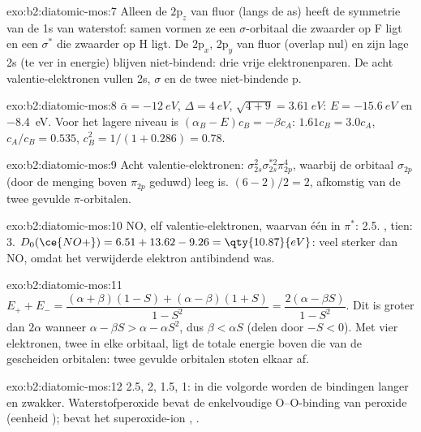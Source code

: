 \begin{solution}{exo:b2:diatomic-mos:7}
Alleen de $2\mathrm p_z$ van fluor (langs de as) heeft de symmetrie van de 1s van waterstof:
samen vormen ze een $\sigma$-orbitaal die zwaarder op F ligt en een $\sigma^*$ die zwaarder op H ligt. De
$2\mathrm p_x$, $2\mathrm p_y$ van fluor (overlap nul) en zijn lage 2s (te ver in energie)
blijven niet-bindend: drie vrije elektronenparen. De acht valentie-elektronen vullen 2s, $\sigma$
en de twee niet-bindende p.
\end{solution}

\begin{solution}{exo:b2:diatomic-mos:8}
$\bar\alpha = \qty{-12}{eV}$, $\Delta = \qty{4}{eV}$, $\sqrt{4 + 9} = \qty{3.61}{eV}$:
$E = \qty{-15.6}{eV}$ en \qty{-8.4}{eV}. Voor het lagere niveau is $(\alpha_B - E)c_B = -\beta
c_A$: $1.61c_B = 3.0c_A$, $c_A/c_B = 0.535$, $c_B^2 = 1/(1 + 0.286) = 0.78$.
\end{solution}

\begin{solution}{exo:b2:diatomic-mos:9}
Acht valentie-elektronen: $\sigma_{2s}^2\sigma_{2s}^{*2}\pi_{2p}^4$, waarbij de orbitaal $\sigma_{2p}$
(door de menging boven $\pi_{2p}$ geduwd) leeg is.  $(6 - 2)/2 = 2$, afkomstig van de
twee gevulde $\pi$-orbitalen.
\end{solution}

\begin{solution}{exo:b2:diatomic-mos:10}
NO, elf valentie-elektronen, waarvan één in $\pi^*$:  2.5. , tien: 
3. $D_0(\ce{NO+}) = 6.51 + 13.62 - 9.26 = \qty{10.87}{eV}$: veel sterker dan NO, omdat
het verwijderde elektron antibindend was.
\end{solution}

\begin{solution}{exo:b2:diatomic-mos:11}
$E_+ + E_- = \dfrac{(\alpha + \beta)(1 - S) + (\alpha - \beta)(1 + S)}{1 - S^2} = \dfrac{2(\alpha -
\beta S)}{1 - S^2}$. Dit is groter dan $2\alpha$ wanneer $\alpha - \beta S > \alpha - \alpha S^2$, dus
$\beta < \alpha S$ (delen door $-S < 0$). Met vier elektronen, twee in elke orbitaal, ligt de
totale energie boven die van de gescheiden orbitalen: twee gevulde orbitalen stoten elkaar af.
\end{solution}

\begin{solution}{exo:b2:diatomic-mos:12}
 2.5, 2, 1.5, 1: in die volgorde worden de bindingen langer en zwakker. Waterstofperoxide
bevat de enkelvoudige O--O-binding van peroxide (eenheid );  bevat
het superoxide-ion , .
\end{solution}

